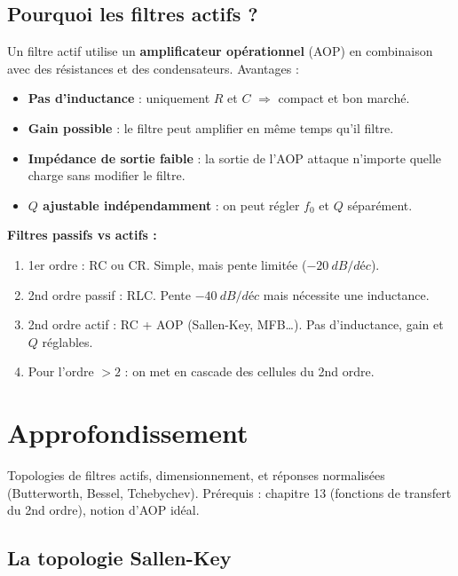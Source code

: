 \documentclass[12pt,a4paper,twoside]{book}
\begin{document}
\subsection{Pourquoi les filtres actifs ?}

Un filtre actif utilise un \textbf{amplificateur opérationnel} (AOP) en combinaison avec des résistances et des condensateurs. Avantages :

\begin{itemize}[nosep]
\item \textbf{Pas d'inductance} : uniquement $R$ et $C$ $\Rightarrow$ compact et bon marché.
\item \textbf{Gain possible} : le filtre peut amplifier en même temps qu'il filtre.
\item \textbf{Impédance de sortie faible} : la sortie de l'AOP attaque n'importe quelle charge sans modifier le filtre.
\item \textbf{$Q$ ajustable indépendamment} : on peut régler $f_0$ et $Q$ séparément.
\end{itemize}

\begin{retenir}
\textbf{Filtres passifs vs actifs :}
\begin{enumerate}[nosep]
\item 1er ordre : RC ou CR. Simple, mais pente limitée ($-\SI{20}{dB/déc}$).
\item 2nd ordre passif : RLC. Pente $-\SI{40}{dB/déc}$ mais nécessite une inductance.
\item 2nd ordre actif : RC + AOP (Sallen-Key, MFB\ldots). Pas d'inductance, gain et $Q$ réglables.
\item Pour l'ordre $> 2$ : on met en cascade des cellules du 2nd ordre.
\end{enumerate}
\end{retenir}

\section{Approfondissement}

\begin{approfondissement}
Topologies de filtres actifs, dimensionnement, et réponses normalisées (Butterworth, Bessel, Tchebychev). Prérequis : chapitre 13 (fonctions de transfert du 2nd ordre), notion d'AOP idéal.
\end{approfondissement}

\subsection{La topologie Sallen-Key}
\end{document}
